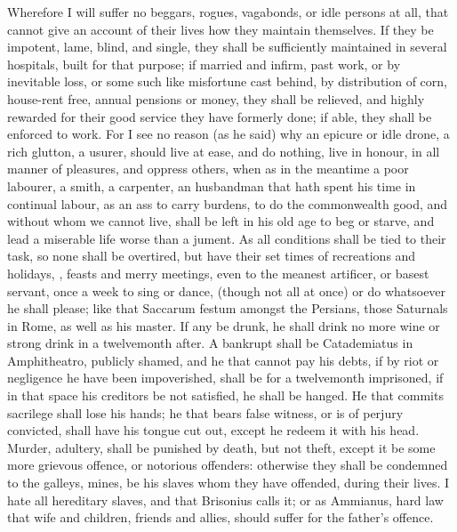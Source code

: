 {Wherefore I will suffer no beggars, rogues, vagabonds, or idle
persons at all, that cannot give an account of their lives how they
maintain themselves. If they be impotent, lame, blind, and single,
they shall be sufficiently maintained in several hospitals, built for
that purpose; if married and infirm, past work, or by inevitable loss,
or some such like misfortune cast behind, by distribution of corn,
house-rent free, annual pensions or money, they shall be relieved, and
highly rewarded for their good service they have formerly done; if
able, they shall be enforced to work. For I see no reason (as
he said) why an epicure or idle drone, a rich glutton, a usurer,
should live at ease, and do nothing, live in honour, in all manner of
pleasures, and oppress others, when as in the meantime a poor labourer,
a smith, a carpenter, an husbandman that hath spent his time in
continual labour, as an ass to carry burdens, to do the commonwealth
good, and without whom we cannot live, shall be left in his old age to
beg or starve, and lead a miserable life worse than a jument. As
all conditions shall be tied to their task, so none shall be
overtired, but have their set times of recreations and holidays,
, feasts and merry meetings, even to the meanest
artificer, or basest servant, once a week to sing or dance, (though not
all at once) or do whatsoever he shall please; like that Saccarum
festum amongst the Persians, those Saturnals in Rome, as well as his
master. If any be drunk, he shall drink no more wine or strong
drink in a twelvemonth after. A bankrupt shall be  Catademiatus in
Amphitheatro, publicly shamed, and he that cannot pay his debts, if by
riot or negligence he have been impoverished, shall be for a
twelvemonth imprisoned, if in that space his creditors be not
satisfied, he shall be hanged. He that commits sacrilege
shall lose his hands; he that bears false witness, or is of perjury
convicted, shall have his tongue cut out, except he redeem it with his
head. Murder,  adultery, shall be punished by death, but not
theft, except it be some more grievous offence, or notorious offenders:
otherwise they shall be condemned to the galleys, mines, be his slaves
whom they have offended, during their lives. I hate all hereditary
slaves, and that  Brisonius calls it; or as
Ammianus,  hard law that wife and children,
friends and allies, should suffer for the father's offence.

}
